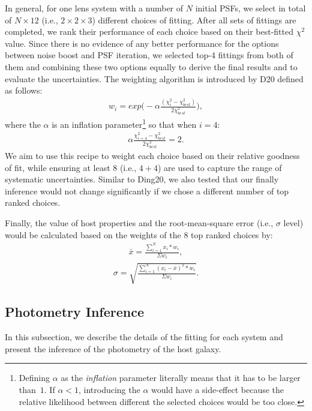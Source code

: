 \documentclass[fleqn,usenatbib]{mnras}
\begin{document}
In general, for one lens system with a number of $N$ initial PSFs, we select in total of $N\times12$ (i.e., $2 \times2 \times3$) different choices of fitting. After all sets of fittings are completed, we rank their performance of each choice based on their best-fitted $\chi^2$ value. Since there is no evidence of any better performance for the options between noise boost and PSF iteration, we selected top-4 fittings from both of them and combining these two options equally to derive the final results and to evaluate the uncertainties. The weighting algorithm is introduced by D20 defined as follows:
\begin{eqnarray}
\label{eq:weights}
w_i = exp \big(- \alpha \frac{ (\chi_i ^2 - \chi_{best} ^2 )}{2 \chi_{best} ^2} \big),
\end{eqnarray} 
where the $\alpha$ is an inflation parameter\footnote{Defining $\alpha$ as the {\it inflation} parameter literally means that it has to be larger than~$1$. If $\alpha<1$, introducing the $\alpha$ would have a side-effect because the relative likelihood between different the selected choices would be too close.} so that when $i=4$:
\begin{eqnarray}
\label{eq:alpha}
\alpha \frac{ \chi_{i=4} ^2 - \chi_{best} ^2 }{2 \chi_{best} ^2} = 2.
\end{eqnarray} 
We aim to use this recipe to weight each choice based on their relative goodness of fit, while ensuring at least 8 (i.e., $4+4$) are used to capture the range of systematic uncertainties. Similar to Ding20, we also tested that our finally inference would not change significantly if we chose a different number of top ranked choices.

Finally, the value of host properties and the root-mean-square error (i.e., $\sigma$ level) would be calculated based on the weights of the 8 top ranked choices by:
\begin{eqnarray}
\label{eq:infer_value}
\bar{x}  =  \frac{  \sum_{i=1}^{N}   x_i * w_i  }{\Sigma w_i} ,
\end{eqnarray} 
\begin{eqnarray}
\label{eq:infer_scatter}
\sigma =   \sqrt{ \frac{  \sum_{i=1}^{N}   (x_i -  \bar{x} ) ^2 * w_i  }{\Sigma w_i} }.
\end{eqnarray} 



\subsection{Photometry Inference}\label{sec:photometry}
In this subsection, we describe the details of the fitting for each system and present the inference of the photometry of the host galaxy.
\end{document}
